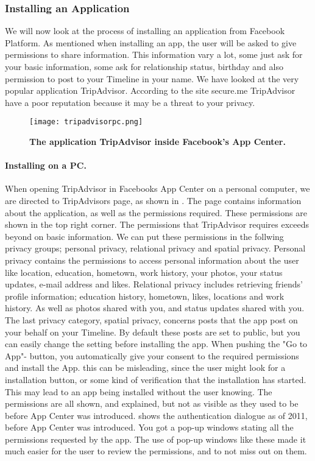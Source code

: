 \subsubsection{Installing an Application}
We will now look at the process of installing an application from Facebook Platform. As mentioned when installing an app, the user will be asked to give permissions to share information. This information vary a lot, some just ask for your basic information, some ask for relationship status, birthday and also permission to post to your Timeline in your name. We have looked at the very popular application TripAdvisor. According to the site secure.me \cite{secure.me} TripAdvisor have a poor reputation because it may be a threat to your privacy.  

\begin{figure}[t]
\centering
\texttt{[image: tripadvisorpc.png]}
\caption[The application TripAdvisor inside Facebook's App Center]{\textbf{The application TripAdvisor inside Facebook's App Center.} } 
\label{fig:tripadvisorpc}
\end{figure}


\paragraph{Installing on a PC.}
When opening TripAdvisor in Facebooks App Center on a personal computer, we are directed to TripAdvisors page, as shown in . The page contains information about the application, as well as the permissions required. These permissions are shown in the top right corner. The permissions that TripAdvisor requires exceeds beyond on basic information. We can put these permissions in the follwing privacy groups; personal privacy, relational privacy and spatial privacy. Personal privacy contains the permissions to access personal information about the user like location, education, hometown, work history, your photos, your status updates, e-mail address and likes. Relational privacy includes retrieving friends' profile information; education history, hometown, likes, locations and work history. As well as photos shared with you, and status updates shared with you. The last privacy category, spatial privacy, concerns posts that the app post on your behalf on your Timeline. By default these posts are set to public, but you can easily change the setting before installing the app. When pushing the "Go to App"- button, you automatically give your consent to the required permissions and install the App. this can be misleading, since the user might look for a installation button, or some kind of verification that the installation has started. This may lead to an app being installed without the user knowing. The permissions are all shown, and explained, but not as visible as they used to be before App Center was introduced.  shows the authentication dialogue as of 2011, before App Center was introduced. You got a pop-up windows stating all the permissions requested by the app. The use of pop-up windows like these made it much easier for the user to review the permissions, and to not miss out on them. 


